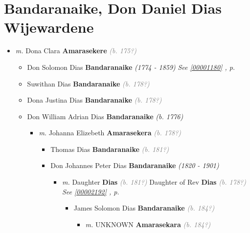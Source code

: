 \documentclass[10pt, openany]{book}
\begin{document}
\chapter{Bandaranaike, Don Daniel Dias Wijewardene}
\label{00002030}
\textcolor{slmaroon}{\textit{}}
\begin{itemize}
\item{\textit{m.} Dona Clara \textbf{Amarasekere} \textcolor{gray}{\textit{(b. 175?)}}   \label{couple:00002030:00002031} \begin{itemize}
\item{Don Solomon Dias \textbf{Bandaranaike} \textcolor{slorange}{\textit{(1774 - 1859)}} \textcolor{slteal}{\textit{See  \autoref{00001180} \textit{, p. \pageref{00001180} }}}}
\item{Suwithan Dias \textbf{Bandaranaike} \textcolor{gray}{\textit{(b. 178?)}}
  }
\item{Dona Justina Dias \textbf{Bandaranaike} \textcolor{gray}{\textit{(b. 178?)}}
   }
\item{Don William Adrian Dias \textbf{Bandaranaike} \textcolor{slorange}{\textit{(b. 1776)}}
\begin{itemize}
\item{\textit{m.} Johanna Elizebeth \textbf{Amarasekera} \textcolor{gray}{\textit{(b. 178?)}}   \label{couple:00002184:00002185} \begin{itemize}
\item{Thomas Dias \textbf{Bandaranaike} \textcolor{gray}{\textit{(b. 181?)}}
  }
\item{Don Johannes Peter Dias \textbf{Bandaranaike} \textcolor{slorange}{\textit{(1820 - 1901)}}
\begin{itemize}
\item{\textit{m.} Daughter \textbf{Dias} \textcolor{gray}{\textit{(b. 181?)}} Daughter of  Rev \textbf{Dias} \textcolor{gray}{\textit{(b. 178?)}} \textcolor{slteal}{\textit{See  \autoref{00002192} \textit{, p. \pageref{00002192} }}}   \label{couple:00002190:00002191} \begin{itemize}
\item{James Solomon Dias \textbf{Bandaranaike} \textcolor{gray}{\textit{(b. 184?)}}
\begin{itemize}
\item{\textit{m.} UNKNOWN \textbf{Amarasekara} \textcolor{gray}{\textit{(b. 184?)}}   \label{couple:00002202:00002204} \begin{itemize}

\end{itemize}}
\end{itemize}}
\end{itemize}}
\end{itemize}}
\end{itemize}}
\end{itemize}}
\end{itemize}}
\end{itemize}
\end{document}
